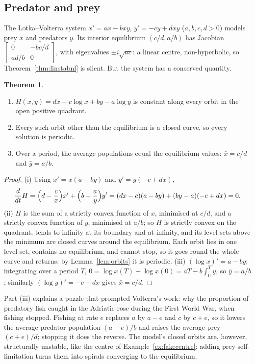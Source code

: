 \documentclass[11pt,a4paper]{article}
\numberwithin{equation}{section}
\theoremstyle{definition}
\newtheorem{thm}{Theorem}[subsection]
\begin{document}
\subsection{Predator and prey}
\label{ssec:predprey}

The Lotka--Volterra system $x' = ax - bxy$, $y' = -cy + dxy$ ($a, b, c, d > 0$) models prey $x$ and predators $y$. Its interior equilibrium $(c/d, a/b)$ has Jacobian $\begin{bmatrix} 0 & -bc/d\\ ad/b & 0\end{bmatrix}$, with
eigenvalues $\pm i\sqrt{ac}$: a linear centre, non-hyperbolic, so Theorem~\ref{thm:linstabnl} is silent. But the system has a conserved quantity.

\begin{thm}
\label{thm:lotka}
\begin{enumerate}[label=(\roman*)]
\item $H(x, y) = dx - c\log x + by - a\log y$ is constant along every orbit in the open positive quadrant.
\item Every such orbit other than the equilibrium is a closed curve, so every solution is periodic.
\item Over a period, the average populations equal the equilibrium values: $\bar x = c/d$ and $\bar y = a/b$.
\end{enumerate}
\end{thm}

\begin{proof}
(i) Using $x' = x(a - by)$ and $y' = y(-c + dx)$,
\[
\frac{d}{dt}H = \Bigl(d - \frac cx\Bigr)x' + \Bigl(b - \frac ay\Bigr)y' = (dx - c)(a - by) + (by - a)(-c + dx) = 0 .
\]
(ii) $H$ is the sum of a strictly convex function of $x$, minimised at $c/d$, and a strictly convex function
of $y$, minimised at $a/b$; so $H$ is strictly convex on the quadrant, tends to infinity at its boundary and at infinity, and its level sets above the minimum are closed curves around
the equilibrium. Each orbit lies in one level set, contains no equilibrium, and cannot stop, so it goes round the whole curve and returns: by Lemma~\ref{lem:orbits} it is periodic. (iii)
$(\log x)' = a - by$; integrating over a period $T$, $0 = \log x(T) - \log x(0) = aT - b\int_0^Ty$, so $\bar y = a/b$; similarly $(\log y)' = -c + dx$ gives $\bar x = c/d$.
\end{proof}

Part (iii) explains a puzzle that prompted Volterra's work: why the proportion of predatory fish caught in the Adriatic rose during the First World War, when fishing stopped. Fishing at rate $e$
replaces $a$ by $a - e$ and $c$ by $c + e$, so it lowers the average predator population $(a - e)/b$ and raises the average prey $(c + e)/d$; stopping it does the reverse. The model's closed orbits are,
however, structurally unstable, like the centre of Example~\ref{ex:fakecentre}: adding prey self-limitation turns them into spirals converging to the equilibrium.
\end{document}
